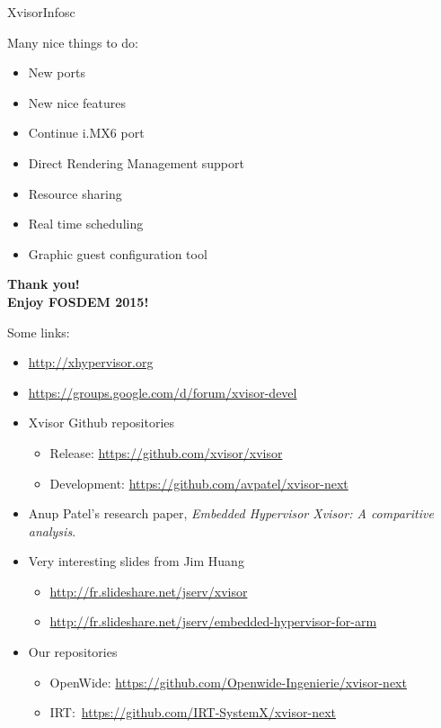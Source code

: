 \documentclass[english,slidetop,9pt,aspectratio=169]{beamer}
\begin{document}
  \begin{myframe}[2]{Xvisor}{Infos}{c}
    \begin{minipage}{.4\textwidth}
      Many nice things to do:
      \begin{itemize}
      \item New ports
      \item New nice features
      \item Continue i.MX6 port
      \item Direct Rendering Management support
      \item Resource sharing
      \item Real time scheduling
      \item Graphic guest configuration tool
      \end{itemize}
      \begin{center}{\vfill}
        {\large \textbf{Thank you!\\
            Enjoy FOSDEM 2015!}}
      \end{center}
    \end{minipage}
    \begin{minipage}{.55\textwidth}
      Some links:
      \begin{itemize}
      \item \url{http://xhypervisor.org}
      \item \url{https://groups.google.com/d/forum/xvisor-devel}
      \item Xvisor Github repositories
        \begin{itemize}
        \item Release: \url{https://github.com/xvisor/xvisor}
        \item Development: \url{https://github.com/avpatel/xvisor-next}
        \end{itemize}
      \item Anup Patel's research paper, \textit{Embedded Hypervisor Xvisor:
        A comparitive analysis}.

      \item Very interesting slides from Jim Huang
        \begin{itemize}
        \item \url{http://fr.slideshare.net/jserv/xvisor}
        \item \url{http://fr.slideshare.net/jserv/embedded-hypervisor-for-arm}
        \end{itemize}
      \item Our repositories
        \begin{itemize}
        \item OpenWide: \url{https://github.com/Openwide-Ingenierie/xvisor-next}
        \item \mbox{IRT: \url{https://github.com/IRT-SystemX/xvisor-next}}
        \end{itemize}
      \end{itemize}
    \end{minipage}
  \end{myframe}
\end{document}
